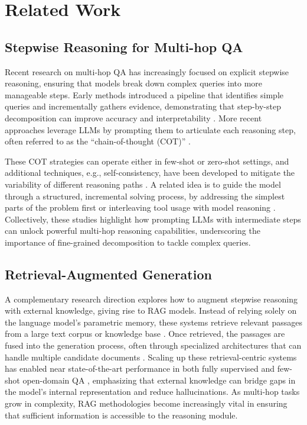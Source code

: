\documentclass[runningheads]{llncs}
\begin{document}
\section{Related Work}

\subsection{Stepwise Reasoning for Multi-hop QA}
Recent research on multi-hop QA has increasingly focused on explicit stepwise reasoning, ensuring that models break down complex queries into more manageable steps. Early methods introduced a pipeline that identifies simple queries and incrementally gathers evidence, demonstrating that step-by-step decomposition can improve accuracy and interpretability \cite{talmor2018web,min2019multi}. More recent approaches leverage LLMs by prompting them to articulate each reasoning step, often referred to as the ``chain-of-thought (COT)'' \cite{wei2022chain,kojima2022large}. 

These COT strategies can operate either in few-shot or zero-shot settings, and additional techniques, e.g., self-consistency, have been developed to mitigate the variability of different reasoning paths \cite{wang2022self}. A related idea is to guide the model through a structured, incremental solving process, by addressing the simplest parts of the problem first \cite{zhou2022least} or interleaving tool usage with model reasoning \cite{yao2023react}. Collectively, these studies highlight how prompting LLMs with intermediate steps can unlock powerful multi-hop reasoning capabilities, underscoring the importance of fine-grained decomposition to tackle complex queries.

\subsection{Retrieval-Augmented Generation}
A complementary research direction explores how to augment stepwise reasoning with external knowledge, giving rise to RAG models. Instead of relying solely on the language model’s parametric memory, these systems retrieve relevant passages from a large text corpus or knowledge base \cite{lewis2020retrieval,guu2020retrieval}. Once retrieved, the passages are fused into the generation process, often through specialized architectures that can handle multiple candidate documents \cite{izacard2020leveraging}. Scaling up these retrieval-centric systems has enabled near state-of-the-art performance in both fully supervised and few-shot open-domain QA \cite{izacard2023atlas}, emphasizing that external knowledge can bridge gaps in the model’s internal representation and reduce hallucinations. As multi-hop tasks grow in complexity, RAG methodologies become increasingly vital in ensuring that sufficient information is accessible to the reasoning module.
\end{document}
